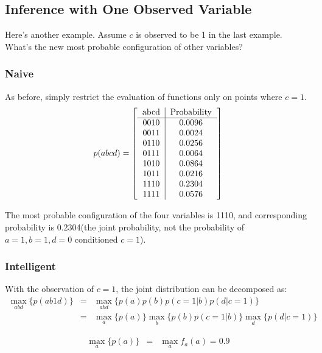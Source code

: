 \subsection{Inference with One Observed Variable}

Here's another example. Assume $c$ is observed to be 1 in 
the last example. What's the new most probable configuration of 
other variables? 

\subsubsection{Naive}
As before, simply restrict the evaluation of functions only 
on points where $c=1$. 
\begin{equation}
p(abcd)=\left[ 
\begin{tabular}{c|c}
abcd & Probability \\
\hline
  0010 & 0.0096 \\ 
  0011 & 0.0024 \\ 
  0110 & 0.0256 \\ 
  0111 & 0.0064 \\ 
  1010 & 0.0864 \\ 
  1011 & 0.0216 \\ 
  1110 & 0.2304 \\ 
  1111 & 0.0576 \\ 
\end{tabular} \right]
\end{equation}

The most probable configuration of the four variables is 1110, and 
corresponding probability is 0.2304(the joint probability, not the probability
of $a=1,b=1,d=0$ conditioned $c=1$). 

\subsubsection{Intelligent}

With the observation of $c=1$, the joint distribution can be decomposed as:
\begin{eqnarray}
\max_{abd} \{ p(ab1d) \} &=& \max_{abd} \{ p(a)p(b)p(c=1|b)p(d|c=1) \} \\
&=& \max_{a} \{ p(a) \} \max_{b} \{p(b)p(c=1|b)\} \max_{d} \{p(d|c=1) \} 
\end{eqnarray}

\begin{eqnarray}
\max_{a} \{ p(a) \} &=& \max_{a}{f_a(a)} = 0.9 
\end{eqnarray}

